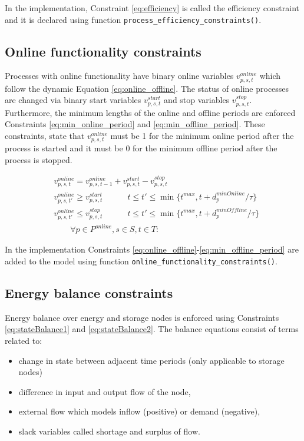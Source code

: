 \documentclass{article}
\begin{document}
In the implementation, Constraint \eqref{eq:efficiency} is called the efficiency constraint and it is declared using function \texttt{process\_efficiency\_constraints()}.

\subsection{Online functionality constraints}
Processes with online functionality have binary online variables $v^{online}_{p,s,t}$ which follow the dynamic Equation \eqref{eq:online_offline}. The status of online processes are changed via binary start variables $v^{start}_{p,s,t}$ and stop variables $v^{stop}_{p,s,t}$. Furthermore, the minimum lengths of the online and offline periods are enforced Constraints \eqref{eq:min_online_period} and \eqref{eq:min_offline_period}. These constraints, state that $v^{online}_{p,s,t}$ must be 1 for the minimum online period after the process is started and it must be 0 for the minimum offline period after the process is stopped.


\begin{align}
    &  v^{online}_{p,s,t} = v^{online}_{p,s,t-1} + v^{start}_{p,s,t} - v^{stop}_{p,s,t} \label{eq:online_offline} \\[0.5cm]
    & v^{online}_{p,s,t'} \geq v^{start}_{p,s,t} \quad \quad \quad t \leq t' \leq \min\{t^{max}, t + d^{minOnline}_p / \tau\} \label{eq:min_online_period}\\[0.5cm]
    &   v^{online}_{p,s,t'} \leq v^{stop}_{p,s,t} \quad \quad \quad t \leq t' \leq \min\{t^{max}, t + d^{minOffline}_p / \tau\}  \label{eq:min_offline_period} \\[0.5cm]
    & \quad \quad \forall p \in P^{online}, s \in S, t\in T: \nonumber 
\end{align}


In the implementation Constraints \eqref{eq:online_offline}-\eqref{eq:min_offline_period} are added to the model using function \texttt{online\_functionality\_constraints()}.


\subsection{Energy balance constraints}
Energy balance over energy and storage nodes is enforced using Constraints \eqref{eq:stateBalance1} and \eqref{eq:stateBalance2}. The balance equations consist of terms related to: 
\begin{itemize}
    \item change in state between adjacent time periods (only applicable to storage nodes)
    \item difference in input and output flow of the node,
    \item external flow which models inflow (positive) or demand (negative),
    \item slack variables called shortage and surplus of flow.
\end{itemize}
\end{document}
